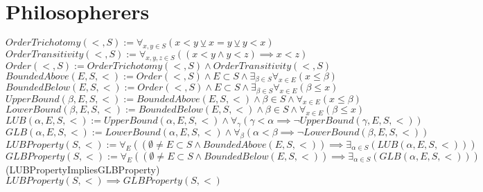 \documentclass{book}
\newcommand{\df}[1]{#1}
\newcommand{\wff}[1]{(#1)}
\newcommand{\rf}[1]{#1}
\newcommand{\abr}{:=}
\newcommand{\pr}[1]{\left(#1\right)}
\newcommand{\setbackgroundcolour}{\pagecolor[rgb]{0.19,0.19,0.19}}
\newcommand{\settextcolour}{\color[rgb]{0.77,0.77,0.77}}
\newcommand{\invertbackgroundtext}{\setbackgroundcolour\settextcolour}
\begin{document}
\invertbackgroundtext 

\tableofcontents

\chapter{Philosopherers}
$\df{OrderTrichotomy}(<, S) \abr \forall_{x, y \in S}(x < y \veebar x = y \veebar y < x)$ \\
$\df{OrderTransitivity}(<, S) \abr \forall_{x, y, z \in S}\pr{(x < y \land y < z) \implies x < z}$ \\
$\df{Order}(<, S) \abr \rf{OrderTrichotomy}(<, S) \land \rf{OrderTransitivity}(<, S)$ \\
$\df{BoundedAbove}(E, S, <) \abr \rf{Order}(<, S) \land E \subset S \land \exists_{\beta \in S} \forall_{x \in E}(x \leq \beta)$ \\
$\df{BoundedBelow}(E, S, <) \abr \rf{Order}(<, S) \land E \subset S \land \exists_{\beta \in S} \forall_{x \in E}(\beta \leq x)$ \\
$\df{UpperBound}(\beta, E, S, <) \abr \rf{BoundedAbove}(E, S, <) \land \beta \in S \land \forall_{x \in E}(x \leq \beta)$ \\
$\df{LowerBound}(\beta, E, S, <) \abr \rf{BoundedBelow}(E, S, <) \land \beta \in S \land \forall_{x \in E}(\beta \leq x)$ \\
$\df{LUB}(\alpha, E, S, <) \abr \rf{UpperBound}(\alpha, E, S, <) \land \forall_{\gamma}\pr{\gamma < \alpha \implies \lnot \rf{UpperBound}(\gamma, E, S, <)}$ \\
$\df{GLB}(\alpha, E, S, <) \abr \rf{LowerBound}(\alpha, E, S, <) \land \forall_{\beta}\pr{\alpha < \beta \implies \lnot \rf{LowerBound}(\beta, E, S, <)}$ \\
$\df{LUBProperty}(S, <) \abr \forall_{E}\pr{\pr{\emptyset \neq E \subset S \land \rf{BoundedAbove}(E, S, <)} \implies \exists_{\alpha \in S}\pr{\rf{LUB}(\alpha, E, S, <)}}$ \\
$\df{GLBProperty}(S, <) \abr \forall_{E}\pr{\pr{\emptyset \neq E \subset S \land \rf{BoundedBelow}(E, S, <)} \implies \exists_{\alpha \in S}\pr{\rf{GLB}(\alpha, E, S, <)}}$ \\
\wff{LUBPropertyImpliesGLBProperty} $\rf{LUBProperty}(S, <) \implies \rf{GLBProperty}(S, <)$ \\
\end{document}
